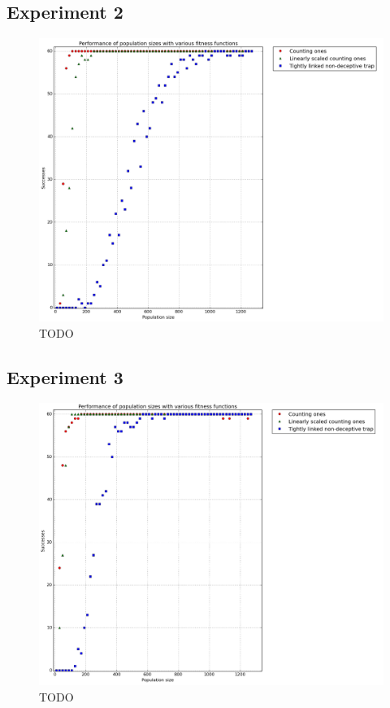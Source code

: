 \documentclass[12pt]{article}
\theoremstyle{definition}
\begin{document}
\subsection*{Experiment 2}
\begin{figure}[H]
    \centering
    \includegraphics[width=1\linewidth]{images/exp2.png}
    \caption{TODO}
\label{fig:exp2}
\end{figure}


\subsection*{Experiment 3}
\begin{figure}[H]
    \centering
    \includegraphics[width=1\linewidth]{images/exp3.png}
    \caption{TODO}
\label{fig:exp3}
\end{figure}
\end{document}
